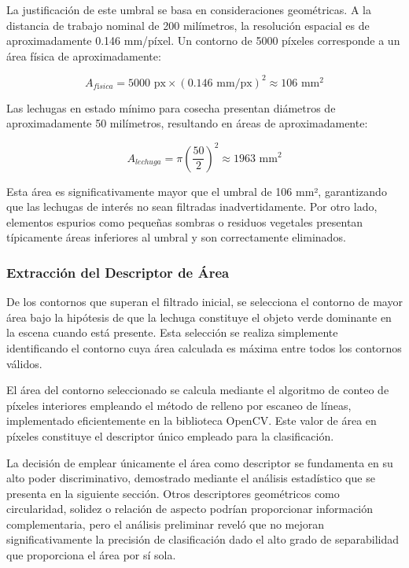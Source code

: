 La justificación de este umbral se basa en consideraciones geométricas. A la distancia de trabajo nominal de 200 milímetros, la resolución espacial es de aproximadamente 0.146 mm/píxel. Un contorno de 5000 píxeles corresponde a un área física de aproximadamente:

\begin{equation}
A_{física} = 5000 \text{ px} \times (0.146 \text{ mm/px})^2 \approx 106 \text{ mm}^2
\end{equation}

Las lechugas en estado mínimo para cosecha presentan diámetros de aproximadamente 50 milímetros, resultando en áreas de aproximadamente:

\begin{equation}
A_{lechuga} = \pi \left(\frac{50}{2}\right)^2 \approx 1963 \text{ mm}^2
\end{equation}

Esta área es significativamente mayor que el umbral de 106 mm², garantizando que las lechugas de interés no sean filtradas inadvertidamente. Por otro lado, elementos espurios como pequeñas sombras o residuos vegetales presentan típicamente áreas inferiores al umbral y son correctamente eliminados.

\subsubsection{Extracción del Descriptor de Área}

De los contornos que superan el filtrado inicial, se selecciona el contorno de mayor área bajo la hipótesis de que la lechuga constituye el objeto verde dominante en la escena cuando está presente. Esta selección se realiza simplemente identificando el contorno cuya área calculada es máxima entre todos los contornos válidos.

El área del contorno seleccionado se calcula mediante el algoritmo de conteo de píxeles interiores empleando el método de relleno por escaneo de líneas, implementado eficientemente en la biblioteca OpenCV. Este valor de área en píxeles constituye el descriptor único empleado para la clasificación.

La decisión de emplear únicamente el área como descriptor se fundamenta en su alto poder discriminativo, demostrado mediante el análisis estadístico que se presenta en la siguiente sección. Otros descriptores geométricos como circularidad, solidez o relación de aspecto podrían proporcionar información complementaria, pero el análisis preliminar reveló que no mejoran significativamente la precisión de clasificación dado el alto grado de separabilidad que proporciona el área por sí sola.

